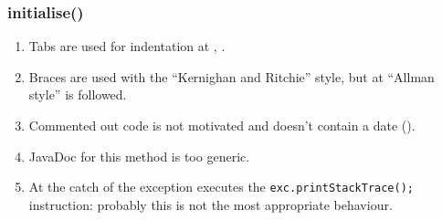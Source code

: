 \subsubsection{initialise()}
\begin{enumerate}
    \item {} Tabs are used for indentation at , .
    \item {} Braces are used with the ``Kernighan and Ritchie'' style, but at  ``Allman style'' is followed.
    \item {} Commented out code is not motivated and doesn't contain a date ().
    \item {} JavaDoc for this method is too generic.
    \item {} At  the catch of the exception executes the \texttt{exc.printStackTrace();} instruction: probably this is not the most appropriate behaviour.
\end{enumerate}
